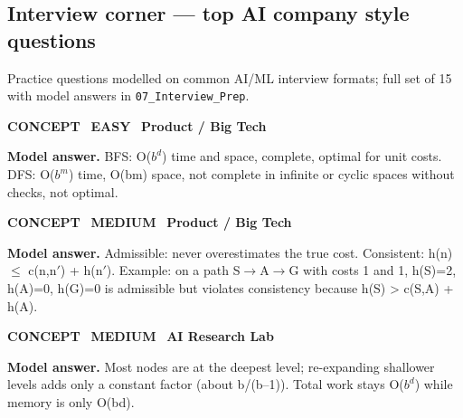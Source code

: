 \subsection*{Interview corner --- top AI company style questions}
{\small\color{slate}Practice questions modelled on common AI/ML interview formats; full set of 15 with model answers in \texttt{07\_Interview\_Prep}.}
\begin{tcolorbox}[enhanced,breakable,colback=white,colframe=teal,arc=2mm,boxrule=0.8pt,left=3mm,right=3mm,
 title={\textbf{QII.01}\quad Compare BFS and DFS on time, space, completeness and optimality.},fonttitle=\color{white}\small,colbacktitle=teal]
\colorbox{teal!15}{\scriptsize\bfseries\color{teal} CONCEPT}\
\colorbox{leaf!15}{\scriptsize\bfseries\color{leaf} EASY}\
\colorbox{navy!8}{\scriptsize\bfseries\color{navy} Product / Big Tech}\par\smallskip
\textbf{\color{navy}Model answer.} BFS: O($b^{d}$) time and space, complete, optimal for unit costs. DFS: O($b^{m}$) time, O(bm) space, not complete in infinite or cyclic spaces without checks, not optimal.
\end{tcolorbox}
\begin{tcolorbox}[enhanced,breakable,colback=white,colframe=teal,arc=2mm,boxrule=0.8pt,left=3mm,right=3mm,
 title={\textbf{QII.02}\quad What makes a heuristic admissible and consistent? Give an example that is admissible but not consistent.},fonttitle=\color{white}\small,colbacktitle=teal]
\colorbox{teal!15}{\scriptsize\bfseries\color{teal} CONCEPT}\
\colorbox{gold!85!black!15}{\scriptsize\bfseries\color{gold!85!black} MEDIUM}\
\colorbox{navy!8}{\scriptsize\bfseries\color{navy} Product / Big Tech}\par\smallskip
\textbf{\color{navy}Model answer.} Admissible: never overestimates the true cost. Consistent: h(n) $\le$ c(n,n$'$) + h(n$'$). Example: on a path S$\to$A$\to$G with costs 1 and 1, h(S)=2, h(A)=0, h(G)=0 is admissible but violates consistency because h(S) > c(S,A) + h(A).
\end{tcolorbox}
\begin{tcolorbox}[enhanced,breakable,colback=white,colframe=teal,arc=2mm,boxrule=0.8pt,left=3mm,right=3mm,
 title={\textbf{QII.03}\quad Why is iterative deepening not much slower than BFS?},fonttitle=\color{white}\small,colbacktitle=teal]
\colorbox{teal!15}{\scriptsize\bfseries\color{teal} CONCEPT}\
\colorbox{gold!85!black!15}{\scriptsize\bfseries\color{gold!85!black} MEDIUM}\
\colorbox{navy!8}{\scriptsize\bfseries\color{navy} AI Research Lab}\par\smallskip
\textbf{\color{navy}Model answer.} Most nodes are at the deepest level; re-expanding shallower levels adds only a constant factor (about b/(b--1)). Total work stays O($b^{d}$) while memory is only O(bd).
\end{tcolorbox}
